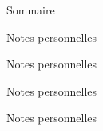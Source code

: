 \documentclass[11pt]{book}
\begin{document}
\makeatletter
    \def\@evenhead{}
    \def\@oddhead{}
\makeatother

\makeatletter
\renewcommand\tableofcontents{
    \begin{center}{\LARGE Sommaire}\end{center}
    \setlength{\columnseprule}{0pt} %
    \begin{multicols}{2}\medskip\footnotesize{\@starttoc{toc}}\end{multicols}
    \setlength{\columnseprule}{0.4pt} %
}
\makeatother
\clearpage\tableofcontents\clearpage
\makeatletter
\def\@evenhead{{\NoAutoSpaceBeforeFDP{\small{\rightmark\hfil\thepage\hfil\leftmark}}}}
\def\@oddhead{{\NoAutoSpaceBeforeFDP{\small{\rightmark\hfil\thepage\hfil\leftmark}}}}
\makeatother
\clearpage
{}\clearpage
\clearpage
\clearpage\makeatletter\def\@evenhead{}\def\@oddhead{}\makeatother\begin{center}Notes personnelles\end{center}\clearpage\makeatletter\def\@evenhead{{\NoAutoSpaceBeforeFDP{\small{\rightmark\hfil\thepage\hfil\leftmark}}}}\def\@oddhead{{\NoAutoSpaceBeforeFDP{\small{\rightmark\hfil\thepage\hfil\leftmark}}}}\makeatother
\clearpage
\clearpage\makeatletter\def\@evenhead{}\def\@oddhead{}\makeatother\begin{center}Notes personnelles\end{center}\clearpage\makeatletter\def\@evenhead{{\NoAutoSpaceBeforeFDP{\small{\rightmark\hfil\thepage\hfil\leftmark}}}}\def\@oddhead{{\NoAutoSpaceBeforeFDP{\small{\rightmark\hfil\thepage\hfil\leftmark}}}}\makeatother
\clearpage
\clearpage\makeatletter\def\@evenhead{}\def\@oddhead{}\makeatother\begin{center}Notes personnelles\end{center}\clearpage\makeatletter\def\@evenhead{{\NoAutoSpaceBeforeFDP{\small{\rightmark\hfil\thepage\hfil\leftmark}}}}\def\@oddhead{{\NoAutoSpaceBeforeFDP{\small{\rightmark\hfil\thepage\hfil\leftmark}}}}\makeatother
\clearpage
\clearpage\makeatletter\def\@evenhead{}\def\@oddhead{}\makeatother\begin{center}Notes personnelles\end{center}\clearpage\makeatletter\def\@evenhead{{\NoAutoSpaceBeforeFDP{\small{\rightmark\hfil\thepage\hfil\leftmark}}}}\def\@oddhead{{\NoAutoSpaceBeforeFDP{\small{\rightmark\hfil\thepage\hfil\leftmark}}}}\makeatother
\end{document}
